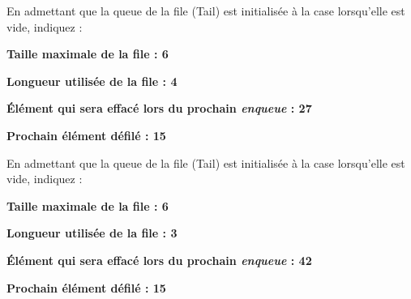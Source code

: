 \documentclass[11pt,a4paper]{article}
\begin{document}
\vspace*{-0.5cm}

\begin{center}
En admettant que la queue de la file (Tail) est initialisée à la case  \fg{} lorsqu'elle est vide, indiquez :

\begin{table}[ht!]
  \centering
  \begin{minipage}{0.4\textwidth}

\textbf{Taille maximale de la file :  \hspace*{0.25cm }  6}

\bigskip

\textbf{Longueur utilisée de la file :  \hspace*{0.25cm }  4}

  \end{minipage}
  \hfillx
  \begin{minipage}{0.6\textwidth}

\textbf{\'Elément qui sera effacé lors du prochain \textit{enqueue} :    27}

\bigskip

\textbf{Prochain élément défilé :  \hspace*{0.25cm }  15}

  \end{minipage}
\end{table}


\vspace*{1cm}


En admettant que la queue de la file (Tail) est initialisée à la case  \fg{} lorsqu'elle est vide, indiquez :

\begin{table}[ht!]
  \centering
  \begin{minipage}{0.4\textwidth}

\textbf{Taille maximale de la file :  \hspace*{0.25cm }  6}

\bigskip

\textbf{Longueur utilisée de la file :  \hspace*{0.25cm }  3}

  \end{minipage}
  \hfillx
  \begin{minipage}{0.6\textwidth}

\textbf{\'Elément qui sera effacé lors du prochain \textit{enqueue} :    42}

\bigskip

\textbf{Prochain élément défilé :  \hspace*{0.25cm }  15}

  \end{minipage}
\end{table}
\end{center}
\end{document}
